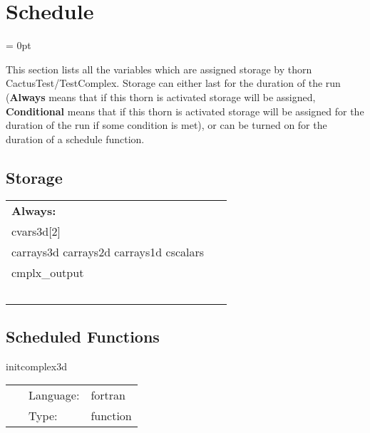 
\section{Schedule} 


\parskip = 0pt


\noindent This section lists all the variables which are assigned storage by thorn CactusTest/TestComplex.  Storage can either last for the duration of the run ({\bf Always} means that if this thorn is activated storage will be assigned, {\bf Conditional} means that if this thorn is activated storage will be assigned for the duration of the run if some condition is met), or can be turned on for the duration of a schedule function.


\subsection*{Storage}

\hspace{5mm}

 \begin{tabular*}{160mm}{ll} 

{\bf Always:}&  ~ \\ 
 cvars3d[2] & ~\\ 
 carrays3d carrays2d carrays1d cscalars & ~\\ 
 cmplx\_output & ~\\ 
~ & ~\\ 
\end{tabular*} 


\subsection*{Scheduled Functions}
\vspace{5mm}


\hspace{5mm} initcomplex3d 

\hspace{5mm}{\it initialise 3d complex grid functions } 


\hspace{5mm}

 \begin{tabular*}{160mm}{cll} 
~ & Language:  & fortran \\ 
~ & Type:  & function \\ 
\end{tabular*} 


